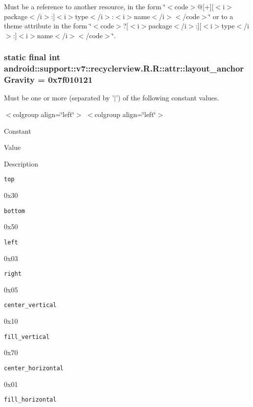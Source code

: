 Must be a reference to another resource, in the form \char`\"{}$<$code$>$@\mbox{[}+\mbox{]}\mbox{[}$<$i$>$package$<$/i$>$:\mbox{]}$<$i$>$type$<$/i$>$:$<$i$>$name$<$/i$>$$<$/code$>$\char`\"{} or to a theme attribute in the form \char`\"{}$<$code$>$?\mbox{[}$<$i$>$package$<$/i$>$:\mbox{]}\mbox{[}$<$i$>$type$<$/i$>$:\mbox{]}$<$i$>$name$<$/i$>$$<$/code$>$\char`\"{}. \hypertarget{classandroid_1_1support_1_1v7_1_1recyclerview_1_1_r_1_1attr_905f579f1b976d15354da3727c3affd2}{
\subsubsection[{layout\_\-anchorGravity}]{\setlength{\rightskip}{0pt plus 5cm}static final int android::support::v7::recyclerview.R.R::attr::layout\_\-anchorGravity = 0x7f010121}}
\label{classandroid_1_1support_1_1v7_1_1recyclerview_1_1_r_1_1attr_905f579f1b976d15354da3727c3affd2}


Must be one or more (separated by '$|$') of the following constant values. \begin{TabularC}{0}
\hline
\end{TabularC}
$<$colgroup align=\char`\"{}left\char`\"{}$>$ $<$colgroup align=\char`\"{}left\char`\"{}$>$ 

Constant

Value

Description 

{\tt top}

0x30

{\tt bottom}

0x50

{\tt left}

0x03

{\tt right}

0x05

{\tt center\_\-vertical}

0x10

{\tt fill\_\-vertical}

0x70

{\tt center\_\-horizontal}

0x01

{\tt fill\_\-horizontal}

